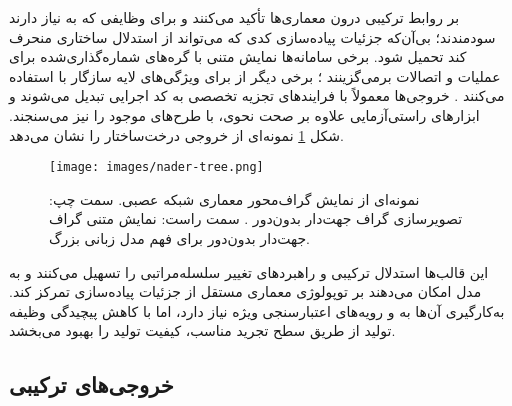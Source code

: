  بر روابط ترکیبی درون معماری‌ها تأکید می‌کنند و برای وظایفی که به  نیاز دارند سودمندند؛ بی‌آن‌که جزئیات پیاده‌سازی کدی که می‌تواند از استدلال ساختاری منحرف کند تحمیل شود. برخی سامانه‌ها نمایش متنی  با گره‌های شماره‌گذاری‌شده برای عملیات و اتصالات برمی‌گزینند \cite{Yang2025NADER}؛ برخی دیگر از  برای ویژگی‌های لایه سازگار با  استفاده می‌کنند \cite{Yu2025GPTNAS}. خروجی‌ها معمولاً با فرایندهای تجزیه تخصصی به کد اجرایی تبدیل می‌شوند و ابزارهای راستی‌آزمایی  علاوه بر صحت نحوی،  با طرح‌های موجود را نیز می‌سنجند. شکل \ref{fig:nader-tree} نمونه‌ای از خروجی درخت‌ساختار را نشان می‌دهد.
\begin{figure}[h!]
    \centering
    \texttt{[image: images/nader-tree.png]}
    \caption[نمونه ای از خروجی درخت ساختار]{
        نمونه‌ای از نمایش گراف‌محور معماری شبکه عصبی. سمت چپ: تصویرسازی گراف جهت‌دار بدون‌دور . سمت راست: نمایش متنی گراف جهت‌دار بدون‌دور برای فهم مدل زبانی بزرگ. \cite{Yang2025NADER}
    }
    \label{fig:nader-tree}
\end{figure}
این قالب‌ها استدلال ترکیبی و راهبردهای تغییر سلسله‌مراتبی را تسهیل می‌کنند و به مدل امکان می‌دهند بر توپولوژی معماری مستقل از جزئیات پیاده‌سازی تمرکز کند. به‌کارگیری آن‌ها به  و رویه‌های اعتبارسنجی ویژه نیاز دارد، اما با کاهش پیچیدگی وظیفه تولید از طریق سطح تجرید مناسب، کیفیت تولید را بهبود می‌بخشد.

\subsection{خروجی‌های ترکیبی}

